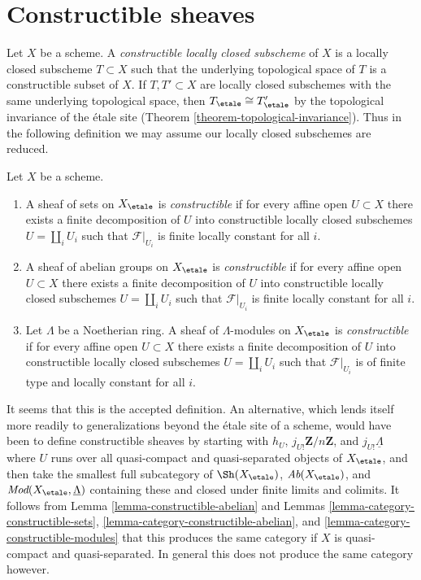 \section{Constructible sheaves}
\label{section-constructible}

\noindent
Let $X$ be a scheme. A {\it constructible locally closed subscheme} of $X$
is a locally closed subscheme $T \subset X$ such that the underlying
topological space of $T$ is a constructible subset of $X$.
If $T, T' \subset X$ are locally
closed subschemes with the same underlying topological space, then
$T_\etale \cong T'_\etale$ by the topological
invariance of the \'etale site (Theorem \ref{theorem-topological-invariance}).
Thus in the following definition we may assume our locally closed
subschemes are reduced.

\begin{definition}
\label{definition-constructible}
Let $X$ be a scheme.
\begin{enumerate}
\item A sheaf of sets on $X_\etale$ is {\it constructible}
if for every affine open $U \subset X$ there exists a finite decomposition
of $U$ into constructible locally closed subschemes $U = \coprod_i U_i$
such that $\mathcal{F}|_{U_i}$ is finite locally constant for all $i$.
\item A sheaf of abelian groups on $X_\etale$ is {\it constructible}
if for every affine open $U \subset X$ there exists a finite decomposition
of $U$ into constructible locally closed subschemes $U = \coprod_i U_i$
such that $\mathcal{F}|_{U_i}$ is finite locally constant for all $i$.
\item Let $\Lambda$ be a Noetherian ring. A sheaf of $\Lambda$-modules
on $X_\etale$ is {\it constructible} if for every affine open
$U \subset X$ there exists a finite decomposition
of $U$ into constructible locally closed subschemes
$U = \coprod_i U_i$ such that
$\mathcal{F}|_{U_i}$ is of finite type and locally constant for all $i$.
\end{enumerate}
\end{definition}

\noindent
It seems that this is the accepted definition. An alternative, which lends
itself more readily to generalizations beyond the \'etale site of a scheme,
would have been to define constructible sheaves by starting with
$h_U$, $j_{U!}\mathbf{Z}/n\mathbf{Z}$, and $j_{U!}\underline{\Lambda}$
where $U$ runs over all quasi-compact and quasi-separated objects
of $X_\etale$, and then take the smallest full subcategory of
$\Sh(X_\etale)$, $\textit{Ab}(X_\etale)$, and
$\textit{Mod}(X_\etale, \underline{\Lambda})$ containing these
and closed under finite limits and colimits. It follows from
Lemma \ref{lemma-constructible-abelian}
and
Lemmas \ref{lemma-category-constructible-sets},
\ref{lemma-category-constructible-abelian}, and
\ref{lemma-category-constructible-modules}
that this produces the same category if $X$ is quasi-compact and
quasi-separated. In general this does not produce the same
category however.

